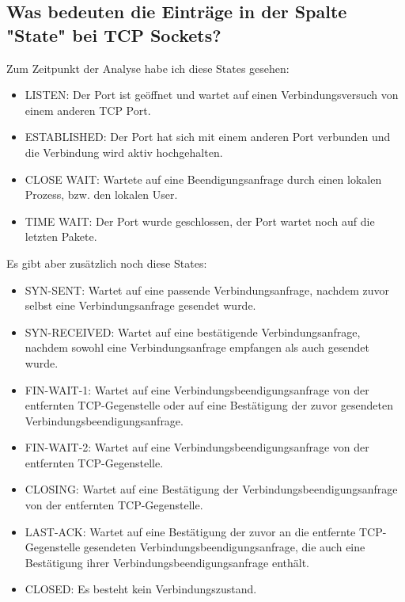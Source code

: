 \documentclass{kdiartcl}
\begin{document}
\subsection{Was bedeuten die Einträge in der Spalte "State" bei TCP Sockets?}
Zum Zeitpunkt der Analyse habe ich diese States gesehen:
\begin{itemize}
    \item LISTEN: Der Port ist geöffnet und wartet auf einen Verbindungsversuch von einem anderen TCP Port.

    \item ESTABLISHED: Der Port hat sich mit einem anderen Port verbunden und die Verbindung wird aktiv hochgehalten.
 
    \item CLOSE WAIT: Wartete auf eine Beendigungsanfrage durch einen lokalen Prozess, bzw. den lokalen User.

    \item TIME WAIT: Der Port wurde geschlossen, der Port wartet noch auf die letzten Pakete.
\end{itemize}
Es gibt aber zusätzlich noch diese States:
\begin{itemize}
    
    \item SYN-SENT: Wartet auf eine passende Verbindungsanfrage, nachdem zuvor selbst eine Verbindungsanfrage gesendet wurde.
    
    \item SYN-RECEIVED: Wartet auf eine bestätigende Verbindungsanfrage, nachdem sowohl eine Verbindungsanfrage empfangen als auch gesendet wurde.
    
    \item FIN-WAIT-1: Wartet auf eine Verbindungsbeendigungsanfrage von der entfernten TCP-Gegenstelle oder auf eine Bestätigung der zuvor gesendeten Verbindungsbeendigungsanfrage.
    
    \item FIN-WAIT-2: Wartet auf eine Verbindungsbeendigungsanfrage von der entfernten TCP-Gegenstelle.
    
    \item CLOSING: Wartet auf eine Bestätigung der Verbindungsbeendigungsanfrage von der entfernten TCP-Gegenstelle.
    
    \item LAST-ACK: Wartet auf eine Bestätigung der zuvor an die entfernte TCP-Gegenstelle gesendeten Verbindungsbeendigungsanfrage, die auch eine Bestätigung ihrer Verbindungsbeendigungsanfrage enthält.
    
    \item CLOSED: Es besteht kein Verbindungszustand.
\end{itemize}
\end{document}
